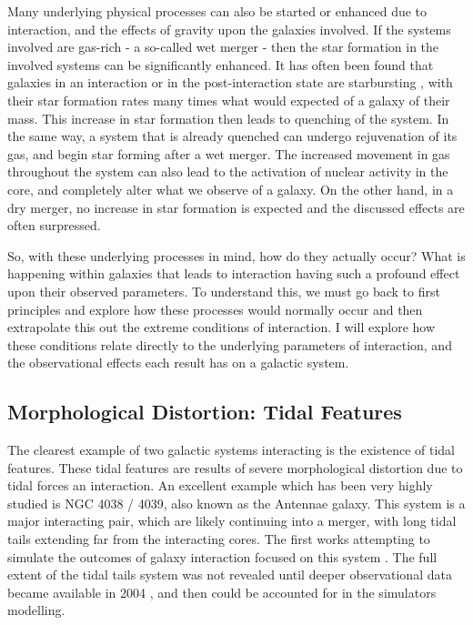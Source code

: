 Many underlying physical processes can also be started or enhanced due to interaction, and the effects of gravity upon the galaxies involved. If the systems involved are gas-rich - a so-called wet merger - then the star formation in the involved systems can be significantly enhanced. It has often been found that galaxies in an interaction or in the post-interaction state are starbursting \citep{Paper on starbursting in interaction}, with their star formation rates many times what would expected of a galaxy of their mass. This increase in star formation then leads to quenching of the system. In the same way, a system that is already quenched can undergo rejuvenation of its gas, and begin star forming after a wet merger. The increased movement in gas throughout the system can also lead to the activation of nuclear activity in the core, and completely alter what we observe of a galaxy. On the other hand, in a dry merger, no increase in star formation is expected and the discussed effects are often surpressed.

So, with these underlying processes in mind, how do they actually occur? What is happening within galaxies that leads to interaction having such a profound effect upon their observed parameters. To understand this, we must go back to first principles and explore how these processes would normally occur and then extrapolate this out the extreme conditions of interaction. I will explore how these conditions relate directly to the underlying parameters of interaction, and the observational effects each result has on a galactic system.

\subsection{Morphological Distortion: Tidal Features}
\noindent The clearest example of two galactic systems interacting is the existence of tidal features. These tidal features are results of severe morphological distortion due to tidal forces an interaction. An excellent example which has been very highly studied is NGC 4038 / 4039, also known as the Antennae galaxy. This system is a major interacting pair, which are likely continuing into a merger, with long tidal tails extending far from the interacting cores. The first works attempting to simulate the outcomes of galaxy interaction focused on this system \citep{Works like TandT which looked at this}. The full extent of the tidal tails system was not revealed until deeper observational data became available in 2004 \citep{Citation from BandM}, and then could be accounted for in the simulators modelling.

